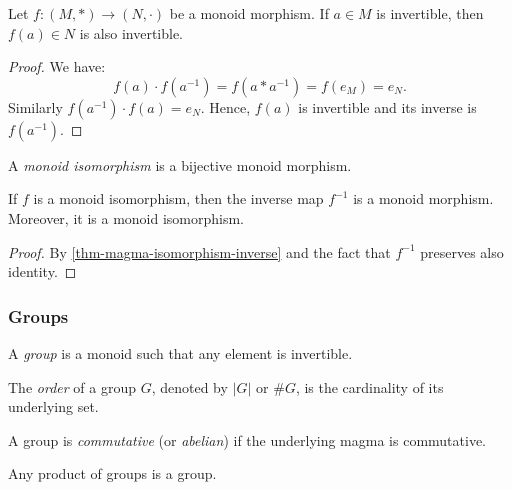\documentclass[12pt]{report}
\begin{document}
\begin{proposition} \label{prop-monoid-invertible-image}
    Let $f \colon (M, \ast) \to (N, \cdot)$ be a monoid morphism. If $a \in M$ is invertible, then $f(a) \in N$ is also invertible.
\end{proposition}

\begin{proof}
    We have:
    \[
        f(a) \cdot f(a^{-1}) = f(a \ast a^{-1}) = f(e_{M}) = e_{N}.
    \]
    Similarly $f(a^{-1}) \cdot f(a) = e_{N}$. Hence, $f(a)$ is invertible and its inverse is $f(a^{-1})$.
\end{proof}

\begin{definition} \label{def-monoid-isomorphism}
    A \emph{monoid isomorphism} is a bijective monoid morphism.
\end{definition}

\begin{theorem} \label{thm-monoid-isomorphism-inverse}
    If $f$ is a monoid isomorphism, then the inverse map $f^{-1}$ is a monoid morphism. Moreover, it is a monoid isomorphism.
\end{theorem}

\begin{proof}
    By \ref{thm-magma-isomorphism-inverse} and the fact that $f^{-1}$ preserves also identity.
\end{proof}

\subsubsection{Groups}

\begin{definition} \label{def-group}
    A \emph{group} is a monoid such that any element is invertible.
\end{definition}

\begin{definition} \label{def-group-order}
    The \emph{order} of a group $G$, denoted by $\lvert G \rvert$ or $\# G$, is the cardinality of its underlying set. 
\end{definition}

\begin{definition} \label{def-group-commutative}
    A group is \emph{commutative} (or \emph{abelian}) if the underlying magma is commutative.
\end{definition}

\begin{proposition} \label{prop-group-product}
    Any product of groups is a group.
\end{proposition}
\end{document}
